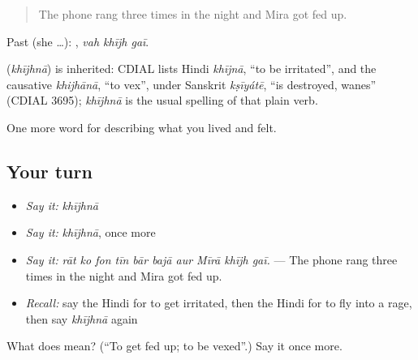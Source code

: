 \begin{quote}
The phone rang three times in the night and Mira got fed up.
\end{quote}

Past (she …):   , \emph{vah khījh gaī}.

\begin{cousinweb}
\textbf{} (\emph{khījhnā}) is inherited: CDIAL lists Hindi \emph{khījnā}, \textquotedblleft{}to be irritated\textquotedblright{}, and the causative \emph{khijhānā}, \textquotedblleft{}to vex\textquotedblright{}, under Sanskrit \emph{kṣīyátē}, \textquotedblleft{}is destroyed, wanes\textquotedblright{} (CDIAL 3695); \emph{khījhnā} is the usual spelling of that plain verb.
\end{cousinweb}

\begin{grammarlens}[title={What you've built}]
One more word for describing what you lived and felt.
\end{grammarlens}

\subsection*{Your turn}
\begin{itemize}
\raggedright
  \item \emph{Say it:} \emph{khījhnā}
  \item \emph{Say it:} \emph{khījhnā}, once more
  \item \emph{Say it:} \emph{rāt ko fon tīn bār bajā aur Mīrā khījh gaī.} — The phone rang three times in the night and Mira got fed up.
  \item \emph{Recall:} say the Hindi for to get irritated, then the Hindi for to fly into a rage, then say \emph{khījhnā} again
\end{itemize}

\begin{tcolorbox}[breakable,colback=teal!4,colframe=teal!35!black,title={Before you move on}]
What does  mean? (\textquotedblleft{}To get fed up; to be vexed\textquotedblright{}.) Say it once more.
\end{tcolorbox}
